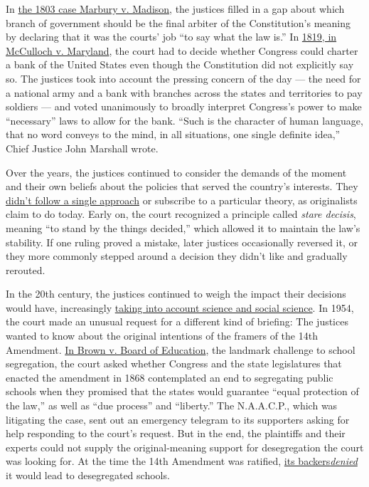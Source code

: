 In \href{https://www.oyez.org/cases/1789-1850/5us137}{the 1803 case
Marbury v. Madison}, the justices filled in a gap about which branch of
government should be the final arbiter of the Constitution's meaning by
declaring that it was the courts' job ``to say what the law is.'' In
\href{https://www.oyez.org/cases/1789-1850/17us316}{1819, in McCulloch
v. Maryland}, the court had to decide whether Congress could charter a
bank of the United States even though the Constitution did not
explicitly say so. The justices took into account the pressing concern
of the day --- the need for a national army and a bank with branches
across the states and territories to pay soldiers --- and voted
unanimously to broadly interpret Congress's power to make ``necessary''
laws to allow for the bank. ``Such is the character of human language,
that no word conveys to the mind, in all situations, one single definite
idea,'' Chief Justice John Marshall wrote.

Over the years, the justices continued to consider the demands of the
moment and their own beliefs about the policies that served the
country's interests. They
\href{https://digitalcommons.law.yale.edu/cgi/viewcontent.cgi?article=1208\&context=fss_papers}{didn't
follow a single approach} or subscribe to a particular theory, as
originalists claim to do today. Early on, the court recognized a
principle called \emph{stare decisis}, meaning ``to stand by the things
decided,'' which allowed it to maintain the law's stability. If one
ruling proved a mistake, later justices occasionally reversed it, or
they more commonly stepped around a decision they didn't like and
gradually rerouted.

In the 20th century, the justices continued to weigh the impact their
decisions would have, increasingly
\href{https://louisville.edu/law/library/special-collections/the-louis-d.-brandeis-collection/the-brandeis-brief-in-its-entirety}{taking
into account science and social science}. In 1954, the court made an
unusual request for a different kind of briefing: The justices wanted to
know about the original intentions of the framers of the 14th Amendment.
\href{https://www.oyez.org/cases/1940-1955/347us483}{In Brown v. Board
of Education}, the landmark challenge to school segregation, the court
asked whether Congress and the state legislatures that enacted the
amendment in 1868 contemplated an end to segregating public schools when
they promised that the states would guarantee ``equal protection of the
law,'' as well as ``due process'' and ``liberty.'' The N.A.A.C.P., which
was litigating the case, sent out an emergency telegram to its
supporters asking for help responding to the court's request. But in the
end, the plaintiffs and their experts could not supply the
original-meaning support for desegregation the court was looking for. At
the time the 14th Amendment was ratified,
\href{https://global.oup.com/academic/product/from-jim-crow-to-civil-rights-9780195310184?cc=us\&lang=en\&}{its
backers}\href{https://global.oup.com/academic/product/from-jim-crow-to-civil-rights-9780195310184?cc=us\&lang=en\&}{\emph{denied}}
it would lead to desegregated schools.

